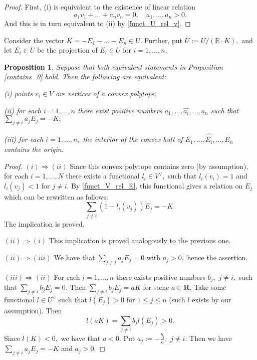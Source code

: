 \documentclass[11pt,leqno]{amsart}
\newtheorem{prop}[theo]{Proposition}
\numberwithin{equation}{section}
\def\R{\mathbb{R}}
\def\bR{{\mathbf R}}
\begin{document}
\begin{proof}First, (i) is equivalent to the existence of linear relation
$$a_1v_1+\dots+a_nv_n=0,\quad a_1,\dots,a_n>0.$$
And this is in turn equivalent to (ii) by \eqref{funct_U_rel_v}.\end{proof}

Consider the vector $K=-E_1-\dots-E_n\in U.$ Further, put $\overline{U}:=U/(\R\cdot K),$ and let $\overline{E_i}\in \overline{U}$
be the projection of $E_i\in U$ for $i=1,\dots,n.$

\begin{prop}\label{is_convex}Suppose that both equivalent statements in Proposition \ref{contains_0} hold. Then the following are equivalent:

(i) points $v_i\in V$ are vertices of a convex polytope;

(ii) for each $i=1,\dots, n$ there exist positive numbers $a_1,\dots,\widehat{a_i},\dots,a_n$ such that
$\sum\limits_{j\ne i}a_jE_j=-K;$

(iii) for each $i=1,\dots, n,$ the interior of the convex hull of $\overline{E_1},\dots,\widehat{\overline{E_i}},\dots,\overline{E_n}$ contains the origin.
\end{prop}

\begin{proof}$(i)\Rightarrow (ii)$ Since this convex polytope contains zero (by assumption), for each $i=1,\dots,N$ there exists a functional $l_i\in V^{\vee},$ such that $l_i\left(v_i\right)=1$ and $l_i\left(v_j\right)<1$ for $j\ne i.$ By \eqref{funct_V_rel_E}, this functional gives a relation on $E_j$ which can be rewritten as follows:
$$\sum\limits_{j\ne i}\left(1-l_i(v_j)\right)E_j=-K.$$ The implication is proved.

$(ii)\Rightarrow (i)$ This implication is proved analogously to the previous one.

$(ii)\Rightarrow (iii)$ We have that $\sum\limits_{j\ne i}a_j\overline{E_j}=0$ with $a_j>0,$ hence the assertion.

$(iii)\Rightarrow (ii)$ For each $i=1,\dots,n$ there exists positive numbers $b_j,$ $j\ne i,$ such that $\sum\limits_{j\ne i}b_j\overline{E_j}=0.$
Then $\sum\limits_{j\ne i}b_jE_j=aK$ for some $a\in\bR.$
Take some functional $l\in U^{\vee}$ such that $l\left(E_j\right)>0$ for $1\leq j\leq n$ (such $l$ exists by our assumption). Then
$$l\left(aK\right)=\sum\limits_{j\ne i}b_jl\left(E_j\right)>0.$$
Since $l\left(K\right)<0,$ we have that $a<0.$ Put $a_j:=-\frac{b_j}a,$ $j\ne i.$ Then we have $\sum\limits_{j\ne i}a_jE_j=-K$ and $a_j>0.$
\end{proof}
\end{document}

